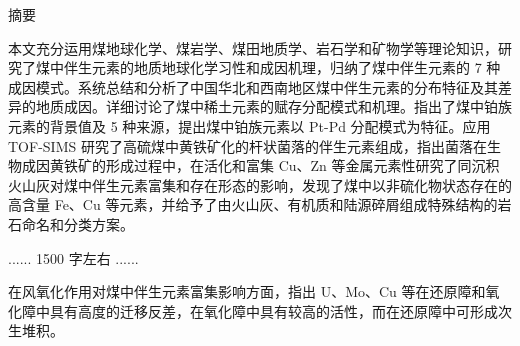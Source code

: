 \clearpage
\pagestyle{fancy}
{}
\setcounter{page}{1}

\begin{center}
    \heiti
    \vspace*{12pt}
    摘\quad\quad 要
    \vspace*{6pt}
\end{center}

\begingroup
    \songti
    \setlength{\parindent}{2em}
    \setlength{\parskip}{0pt}
    
    本文充分运用煤地球化学、煤岩学、煤田地质学、岩石学和矿物学等理论知识，研究了煤中伴生元素的地质地球化学习性和成因机理，归纳了煤中伴生元素的 7 种成因模式。系统总结和分析了中国华北和西南地区煤中伴生元素的分布特征及其差异的地质成因。详细讨论了煤中稀土元素的赋存分配模式和机理。指出了煤中铂族元素的背景值及 5 种来源，提出煤中铂族元素以 Pt-Pd 分配模式为特征。应用 TOF-SIMS 研究了高硫煤中黄铁矿化的杆状菌落的伴生元素组成，指出菌落在生物成因黄铁矿的形成过程中，在活化和富集 Cu、Zn 等金属元素性研究了同沉积火山灰对煤中伴生元素富集和存在形态的影响，发现了煤中以非硫化物状态存在的高含量 Fe、Cu 等元素，并给予了由火山灰、有机质和陆源碎屑组成特殊结构的岩石命名和分类方案。
    \par
    \vspace{\baselineskip}
    \centerline{\color{red}...... 1500 字左右 ......}
    \par
    \vspace{\baselineskip}
    在风氧化作用对煤中伴生元素富集影响方面，指出 U、Mo、Cu 等在还原障和氧化障中具有高度的迁移反差，在氧化障中具有较高的活性，而在还原障中可形成次生堆积。
    \par
\endgroup

\par
\vspace{6pt}
\begingroup
    \noindent{}
\endgroup
\clearpage
